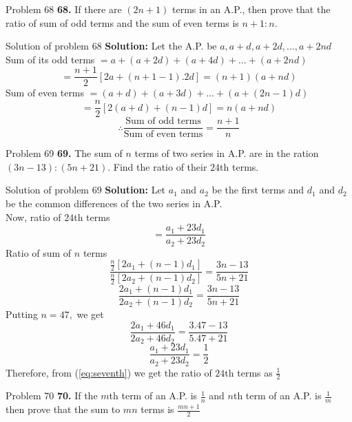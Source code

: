 \documentclass[aspectratio=1610,8pt]{beamer}
\begin{document}
\begin{frame}{Problem 68}
  \textbf{68.} If there are $(2n + 1)$ terms in an A.P., then prove that the
  ratio of sum of odd terms and the sum of even terms is $n + 1: n.$
\end{frame}
\begin{frame}{Solution of problem 68}
  \textbf{Solution:} Let the A.P. be $a, a+d, a+2d, \ldots, a + 2nd$\\
  Sum of its odd terms $= a + (a + 2d) + (a + 4d) + \ldots + (a + 2nd)$
  $$= \frac{n + 1}{2}[2a + (n + 1 - 1).2d] = (n + 1)(a + nd)$$
  Sum of even terms $= (a + d) + (a + 3d) + \ldots + (a + (2n-1)d)$
  $$= \frac{n}{2}[2(a + d) + (n - 1)d] = n(a + nd)$$
  $$\therefore \frac{\text{Sum of odd terms}}{\text{Sum of even terms}} =
  \frac{n + 1}{n}$$
\end{frame}
\begin{frame}{Problem 69}
  \textbf{69.} The sum of $n$ terms of two series in A.P. are in the ration
  $(3n - 13): (5n + 21).$ Find the ratio of their $24$th terms.
\end{frame}
\begin{frame}{Solution of problem 69}
  \textbf{Solution:} Let $a_1$ and $a_2$ be the first terms and $d_1$ and $d_2$
  be the common differences of the two series in A.P.\\
  Now, ratio of $24$th terms
  \setcounter{equation}{0}
  \begin{equation}\label{eq:seventh}
    = \frac{a_1 + 23d_1}{a_2 + 23d_2}
  \end{equation}
  Ratio of sum of $n$ terms
  $$\frac{\frac{n}{2}[2a_1 + (n - 1)d_1]}{\frac{n}{2}[2a_2 + (n - 1)d_2]} =
  \frac{3n - 13}{5n + 21}$$
  $$\frac{2a_1 + (n - 1)d_1}{2a_2 + (n - 1)d_2} = \frac{3n - 13}{5n + 21}$$
  Putting $n=47,$ we get
  $$\frac{2a_1 + 46d_1}{2a_2 + 46d_2} = \frac{3.47 - 13}{5.47 + 21}$$
  $$\frac{a_1 + 23d_1}{a_2 + 23d_2} = \frac{1}{2}$$
  Therefore, from (\ref{eq:seventh}) we get the ratio of $24$th terms as $\frac{1}{2}$
\end{frame}
\begin{frame}{Problem 70}
  \textbf{70.} If the $m$th term of an A.P. is $\frac{1}{n}$ and $n$th term of
  an A.P. is $\frac{1}{m}$ then prove that the sum to $mn$ terms is $\frac{mn +
  1}{2}$
\end{frame}
\end{document}
